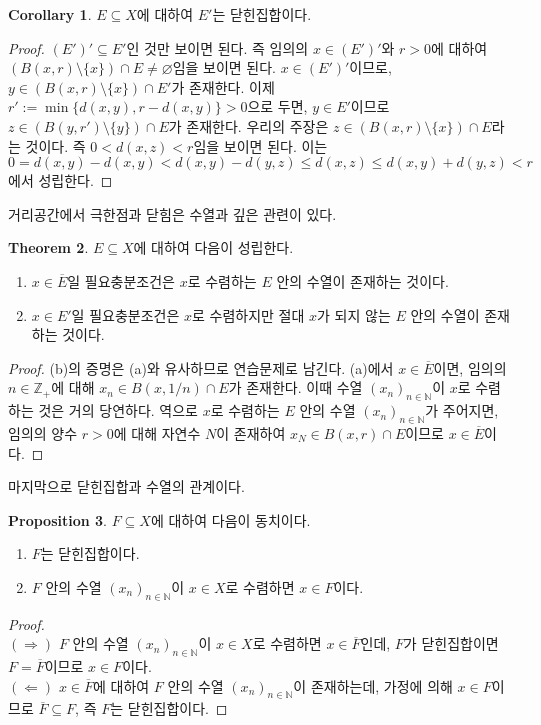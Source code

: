 \documentclass[11pt]{book}
\numberwithin{equation}{chapter}
\def\NN{\mathbb{N}}
\def\ZZ{\mathbb{Z}}
\theoremstyle{definition}
\newtheorem{thm}{Theorem}[section]
\newtheorem{cor}[thm]{Corollary}
\newtheorem{prop}[thm]{Proposition}
\begin{document}
\begin{cor}
    \(E \subseteq X\)에 대하여 \(E'\)는 닫힌집합이다.
\end{cor}
\begin{proof}
    \((E')' \subseteq E'\)인 것만 보이면 된다. 즉 임의의 \(x \in (E')'\)와 \(r > 0\)에 대하여 \((B(x, r) \setminus \{x\}) \cap E \ne \varnothing\)임을 보이면 된다. \(x \in (E')'\)이므로, \(y \in (B(x, r) \setminus \{x\}) \cap E'\)가 존재한다. 이제 \(r' := \min\{d(x,y), r - d(x, y)\} > 0\)으로 두면, \(y \in E'\)이므로 \(z \in (B(y, r') \setminus \{y\}) \cap E\)가 존재한다. 우리의 주장은 \(z \in (B(x, r) \setminus \{x\}) \cap E\)라는 것이다. 즉 \(0 < d(x, z) < r\)임을 보이면 된다. 이는
    \[
    0 = d(x, y) - d(x, y) < d(x,y) - d(y,z) \le d(x, z) \le d(x,y) + d(y, z) < r
    \]
    에서 성립한다.
\end{proof}

거리공간에서 극한점과 닫힘은 수열과 깊은 관련이 있다.

\begin{thm}
    \(E \subseteq X\)에 대하여 다음이 성립한다.
    \begin{enumerate}[label=(\alph*), leftmargin=2\parindent]
        \item \(x \in \overline{E}\)일 필요충분조건은 \(x\)로 수렴하는 \(E\) 안의 수열이 존재하는 것이다.
        \item \(x \in E'\)일 필요충분조건은 \(x\)로 수렴하지만 절대 \(x\)가 되지 않는 \(E\) 안의 수열이 존재하는 것이다.
    \end{enumerate}
\end{thm}
\begin{proof}
    (b)의 증명은 (a)와 유사하므로 연습문제로 남긴다. (a)에서 \(x \in \overline{E}\)이면, 임의의 \(n \in \ZZ_+\)에 대해 \(x_n \in B(x, 1/n) \cap E\)가 존재한다. 이때 수열 \((x_n)_{n \in \NN}\)이 \(x\)로 수렴하는 것은 거의 당연하다. 역으로 \(x\)로 수렴하는 \(E\) 안의 수열 \((x_n)_{n \in \NN}\)가 주어지면, 임의의 양수 \(r > 0\)에 대해 자연수 \(N\)이 존재하여 \(x_N \in B(x, r) \cap E\)이므로 \(x \in \overline{E}\)이다.
\end{proof}

마지막으로 닫힌집합과 수열의 관계이다.

\begin{prop}
    \(F \subseteq X\)에 대하여 다음이 동치이다.
    \begin{enumerate}[label=(\alph*), leftmargin=2\parindent]
        \item \(F\)는 닫힌집합이다.
        \item \(F\) 안의 수열 \((x_n)_{n \in \NN}\)이 \(x \in X\)로 수렴하면 \(x \in F\)이다.
    \end{enumerate}
\end{prop}
\begin{proof}
    \quad\\
    \((\Rightarrow)\) \(F\) 안의 수열 \((x_n)_{n \in \NN}\)이 \(x \in X\)로 수렴하면 \(x \in \overline{F}\)인데, \(F\)가 닫힌집합이면 \(F = \overline{F}\)이므로 \(x \in F\)이다.\\
    \((\Leftarrow)\) \(x \in \overline{F}\)에 대하여 \(F\) 안의 수열 \((x_n)_{n \in \NN}\)이 존재하는데, 가정에 의해 \(x \in F\)이므로 \(\overline{F} \subseteq F\), 즉 \(F\)는 닫힌집합이다.
\end{proof}
\end{document}
